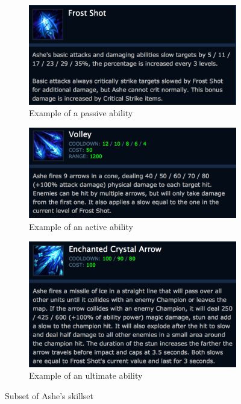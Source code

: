 \begin{figure}[!htb]
  \centering
  \begin{subfigure}[b]{0.49\textwidth}
    \includegraphics[width=\textwidth]{img/frostshot.png}
    \caption{Example of a passive ability}\label{fig:frostshot}
  \end{subfigure}
  \begin{subfigure}[b]{0.49\textwidth}
    \includegraphics[width=\textwidth]{img/volley.png}
    \caption{Example of an active ability}\label{fig:volley}
  \end{subfigure}
  \begin{subfigure}[b]{0.49\textwidth}
    \includegraphics[width=\textwidth]{img/enchanted.png}
    \caption{Example of an ultimate ability}\label{fig:enchanted}
  \end{subfigure}
  \caption{Subset of Ashe's skillset~\cite{ashe}}\label{fig:ashe}
\end{figure}
